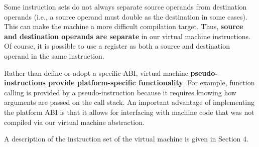 Some instruction sets do not always separate source operands from
destination operands (i.e., a source operand must double as the destination
in some cases).
This can make the machine a more difficult compilation target.
Thus, \textbf{source and destination operands are separate} in our
virtual machine instructions.
Of course, it is possible to use a register as both a source
and destination operand in the same instruction.

Rather than define or adopt a specific ABI, virtual machine \textbf{pseudo-instructions
provide platform-specific functionality}.
For example, function calling is provided by a pseudo-instruction because
it requires knowing how arguments are passed on the call stack.
An important advantage of implementing the platform ABI is that it allows for interfacing
with machine code that was not compiled via our virtual machine abstraction.

A description of the instruction set of the virtual machine
is given in Section 4.
